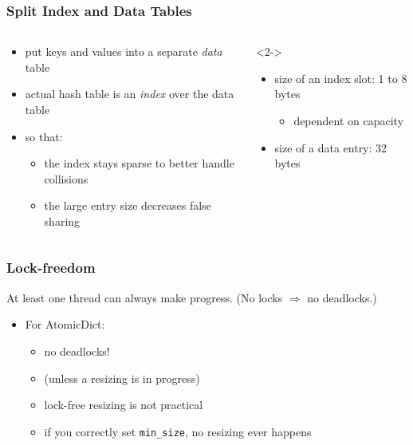 \documentclass[aspectratio=169]{beamer}
\begin{document}
\begin{frame}
    \frametitle{Split Index and Data Tables}

    \begin{columns}
        \begin{column}{0.5\textwidth}
            \begin{itemize}
                \item put keys and values into a separate \textit{data} table
                \item actual hash table is an \textit{index} over the data table
                \item<3-> so that:
                \begin{itemize}
                    \item<3-> the index stays sparse to better handle collisions
                    \item<3-> the large entry size decreases false sharing
                \end{itemize}
            \end{itemize}
        \end{column}

        \begin{column}{0.5\textwidth}<2->
            \begin{itemize}
                \item size of an index slot: 1 to 8 bytes
                \begin{itemize}
                    \item dependent on capacity
                \end{itemize}
                \item size of a data entry: 32 bytes
            \end{itemize}
        \end{column}
    \end{columns}
\end{frame}

\begin{frame}
    \frametitle{Lock-freedom}

    \begin{definition}
        At least one thread can always make progress.
        (No locks $\Rightarrow$ no deadlocks.)
    \end{definition}
    
    \vspace{1cm}

    \begin{itemize}
        \item<2-> For AtomicDict:
        \begin{itemize}
            \item<2-> no deadlocks!
            \item<2-> (unless a resizing is in progress)
            \item<2-> lock-free resizing is not practical
            \item<2-> if you correctly set {\footnotesize\texttt{min\_size}}, no resizing ever happens
        \end{itemize}
    \end{itemize}
\end{frame}
\end{document}
